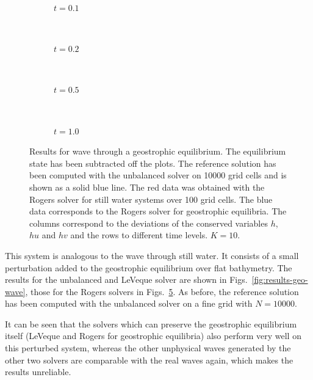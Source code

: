 \begin{figure}
  \centering
  \begin{subfigure}{\textwidth}
    \caption{$t = 0.1$}
    \label{fig:results-geo-wave-rog-1}
  \end{subfigure} \\
  \begin{subfigure}{\textwidth}
    \caption{$t = 0.2$}
    \label{fig:results-geo-wave-rog-2}
  \end{subfigure} \\
  \begin{subfigure}{\textwidth}
    \caption{$t = 0.5$}
    \label{fig:results-geo-wave-rog-5}
  \end{subfigure} \\
  \begin{subfigure}{\textwidth}
    \caption{$t = 1.0$}
    \label{fig:results-geo-wave-rog-10}
  \end{subfigure}
  \caption{Results for wave through a geostrophic equilibrium. The equilibrium state has been subtracted off the plots. The reference solution has been computed with the unbalanced solver on 10000 grid cells and is shown as a solid blue line. The red data was obtained with the Rogers solver for still water systems over 100 grid cells. The blue data corresponds to the Rogers solver for geostrophic equilibria. The columns correspond to the deviations of the conserved variables $h$, $hu$ and $hv$ and the rows to different time levels. $K = 10$.}
  \label{fig:results-geo-wave-rog}
\end{figure}

This system is analogous to the wave through still water. It consists of a small perturbation added to the geostrophic equilibrium over flat bathymetry. The results for the unbalanced and LeVeque solver are shown in Figs.~\ref{fig:results-geo-wave}, those for the Rogers solvers in Figs.~\ref{fig:results-geo-wave-rog}. As before, the reference solution has been computed with the unbalanced solver on a fine grid with $N = 10000$.

It can be seen that the solvers which can preserve the geostrophic equilibrium itself (LeVeque and Rogers for geostrophic equilibria) also perform very well on this perturbed system, whereas the other unphysical waves generated by the other two solvers are comparable with the real waves again, which makes the results unreliable.

